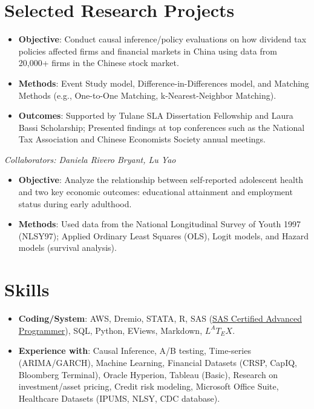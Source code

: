 \documentclass{resume}
\begin{document}
\section{Selected Research Projects}

\begin{itemize}
    \item \textbf{Objective}: Conduct causal inference/policy evaluations on how dividend tax policies affected firms and financial markets in China using data from 20,000+ firms in the Chinese stock market.
    \item \textbf{Methods}: Event Study model, Difference-in-Differences model, and Matching Methods (e.g., One-to-One Matching, k-Nearest-Neighbor Matching).
    \item \textbf{Outcomes}: Supported by Tulane SLA Dissertation Fellowship and Laura Bassi Scholarship; Presented findings at top conferences such as the National Tax Association and Chinese Economists Society annual meetings.
\end{itemize}

\textit{Collaborators: Daniela Rivero Bryant, Lu Yao}  
\begin{itemize}
    \item \textbf{Objective}: Analyze the relationship between self-reported adolescent health and two key economic outcomes: educational attainment and employment status during early adulthood.
    \item \textbf{Methods}: Used data from the National Longitudinal Survey of Youth 1997 (NLSY97); Applied Ordinary Least Squares (OLS), Logit models, and Hazard models (survival analysis).
\end{itemize}

\section{Skills}
\begin{itemize}[parsep=0.25ex]
    \item \textbf{Coding/System}: AWS, Dremio, STATA, R, SAS (\href{https://www.youracclaim.com/badges/c4bce10e-7398-4203-9d11-f9c6723749a4/linked_in_profile}{SAS Certified Advanced Programmer}), SQL, Python, EViews, Markdown, $L^{A}T_{E}X$.
    \item \textbf{Experience with}: Causal Inference, A/B testing, Time-series (ARIMA/GARCH), Machine Learning, Financial Datasets (CRSP, CapIQ, Bloomberg Terminal), Oracle Hyperion, Tableau (Basic), Research on investment/asset pricing, Credit risk modeling, Microsoft Office Suite, Healthcare Datasets (IPUMS, NLSY, CDC database).
\end{itemize}
\end{document}
